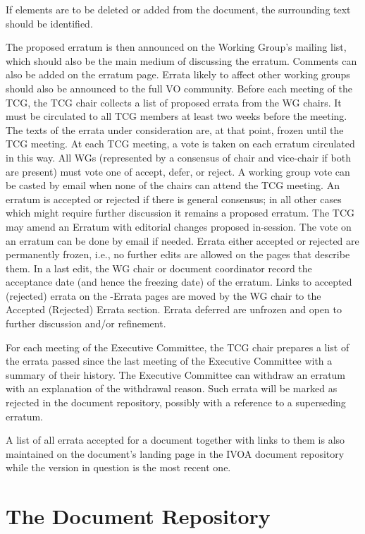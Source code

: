 \documentclass[11pt,a4paper]{ivoa}
\begin{document}
If elements are to be deleted or added from the document, the
surrounding text should be identified.

The proposed erratum is then announced on the Working Group's mailing
list, which should also be the main medium of discussing the erratum.
Comments can also be added on the erratum page. Errata likely to affect
other working groups should also be announced to the full VO community.
Before each meeting of the TCG, the TCG chair collects a list of
proposed errata from the WG chairs.  It must be circulated to all TCG
members at least two weeks before the meeting.  The texts of the errata
under consideration are, at that point, frozen until the TCG meeting.
At each TCG meeting, a vote is taken on each erratum circulated in this
way.  All WGs (represented by a consensus of chair and vice-chair if
both are present) must vote one of accept, defer, or reject. A working
group vote can be casted by email when none of the chairs can attend the
TCG meeting.  An erratum is accepted or rejected if there is general
consensus; in all other cases which might require further discussion it
remains a proposed erratum.  The TCG may amend an Erratum with editorial
changes proposed in-session. The vote on an erratum can be done by email
if needed.  Errata either accepted or rejected are permanently frozen,
i.e., no further edits are allowed on the pages that describe them. In a
last edit, the WG chair or document coordinator record the acceptance
date (and hence the freezing date) of the erratum.  Links to accepted
(rejected) errata on the -Errata pages are moved by the WG chair to the
Accepted (Rejected) Errata section.   Errata deferred are unfrozen and
open to further discussion and/or refinement.

For each meeting of the Executive Committee, the TCG chair prepares a
list of the errata passed since the last meeting of the Executive
Committee with a summary of their history. The Executive Committee can
withdraw an erratum with an explanation of the withdrawal reason. Such
errata will be marked as rejected in the document repository, possibly
with a reference to a superseding erratum.

A list of all errata accepted for a document together with links to them
is also maintained on the document's landing page in the IVOA document
repository while the version in question is the most recent one.

\section{The Document Repository}
\label{sect:doccoll}
\end{document}
